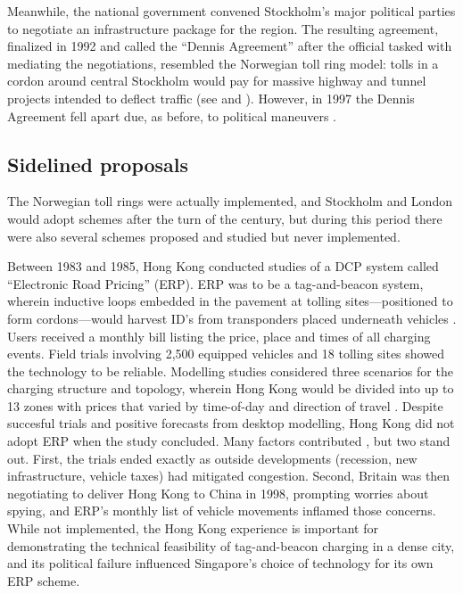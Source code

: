 Meanwhile, the national government convened Stockholm's major political parties to negotiate an infrastructure package for the region. The resulting agreement, finalized in 1992 and called the ``Dennis Agreement'' after the official tasked with mediating the negotiations, resembled the Norwegian toll ring model: tolls in a cordon around central Stockholm would pay for massive highway and tunnel projects intended to deflect traffic  (see \citet[pp. 39-40]{Gomez-Ibanez1994} and \citet[p. 92]{Hau1992}). However, in 1997  the Dennis Agreement fell apart due, as before, to political maneuvers \citep{Ahlstrand2001,GullbergIsaksson2009}.

\subsection{Sidelined proposals}

The Norwegian toll rings were actually implemented, and Stockholm and London would adopt schemes after the turn of the century, but during this period there were also several schemes proposed and studied but never implemented.

 Between 1983 and 1985, Hong Kong conducted studies of a DCP system called ``Electronic Road Pricing'' (ERP). ERP was to be a tag-and-beacon system, wherein inductive loops embedded in the pavement at tolling sites---positioned to form cordons---would harvest ID's from transponders placed underneath vehicles \citep{Dawson1986}. Users received a monthly bill listing the price, place and times of all charging events. Field trials involving 2,500 equipped vehicles and 18 tolling sites showed the technology to be reliable. Modelling studies considered three scenarios for the charging structure and topology, wherein Hong Kong would be divided into up to 13 zones with prices that varied by time-of-day and direction of travel \citep[Table 11, p. 23]{Gomez-Ibanez1994}.  Despite succesful trials and positive forecasts from desktop modelling, Hong Kong did not adopt ERP when the study concluded. Many factors contributed \citep{Hau1990,Borins1988}, but two stand out. First, the trials ended exactly as outside developments (recession, new infrastructure, vehicle taxes) had mitigated congestion. Second, Britain was then negotiating to deliver Hong Kong to China in 1998, prompting worries about spying, and  ERP's monthly list of vehicle movements inflamed those concerns. While not implemented, the Hong Kong experience is important for demonstrating the technical feasibility of tag-and-beacon charging in a dense city, and its political failure influenced Singapore's choice of technology for its own ERP scheme.


